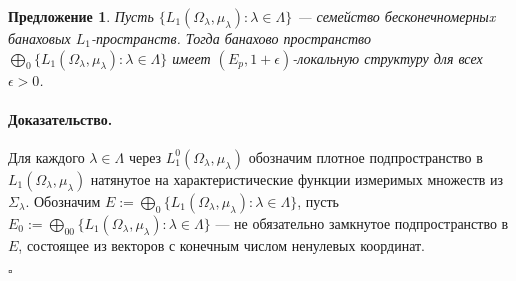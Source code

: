 \documentclass[12pt]{article}
\newtheorem{proposition}[theorem]{Предложение}
\renewenvironment{proof}{\paragraph{Доказательство.}}{\hfill$\square$\medskip}
\begin{document}
\begin{proposition}\label{C0SumOfL1SpHaveDPP} Пусть $
        \{L_1(\Omega_\lambda,\mu_\lambda):\lambda\in\Lambda \}$ --- семейство
    бесконечномерныx банаховых $L_1$-пространств. Тогда банахово пространство
    $\bigoplus_0 \{L_1(\Omega_\lambda,\mu_\lambda):\lambda\in\Lambda \}$ имеет
    $(E_p,1+\epsilon)$-локальную структуру для всех $\epsilon>0$.
\end{proposition}
\begin{proof} Для каждого $\lambda\in\Lambda$ через
    $L_1^0(\Omega_\lambda,\mu_\lambda)$ обозначим плотное подпространство в
    $L_1(\Omega_\lambda,\mu_\lambda)$ натянутое на характеристические функции
    измеримых множеств из $\Sigma_\lambda$. Обозначим $E:=\bigoplus_0
        \{L_1(\Omega_\lambda,\mu_\lambda):\lambda\in\Lambda \}$, пусть
    $E_0:=\bigoplus_{00} \{L_1(\Omega_\lambda,\mu_\lambda):\lambda\in\Lambda \}$
    --- не обязательно замкнутое подпространство в $E$, состоящее из векторов с
    конечным числом ненулевых координат.


\end{proof}
\end{document}
